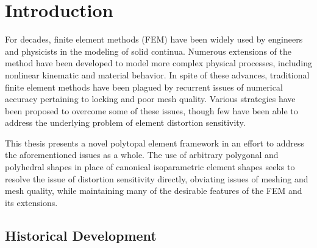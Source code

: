 \chapter{Introduction}


	For decades, finite element methods (FEM) have been widely used by engineers and physicists in the modeling of solid continua. Numerous extensions of the method have been developed to model more complex physical processes, including nonlinear kinematic and material behavior.
	In spite of these advances, traditional finite element methods have been plagued by recurrent issues of numerical accuracy pertaining to locking and poor mesh quality. Various strategies have been proposed to overcome some of these issues, though few have been able to address the underlying problem of element distortion sensitivity.
	
	This thesis presents a novel polytopal element framework in an effort to address the aforementioned issues as a whole. The use of arbitrary polygonal and polyhedral shapes in place of canonical isoparametric element shapes seeks to resolve the issue of distortion sensitivity directly, obviating issues of meshing and mesh quality, while maintaining many of the desirable features of the FEM and its extensions.

\section{Historical Development} %

